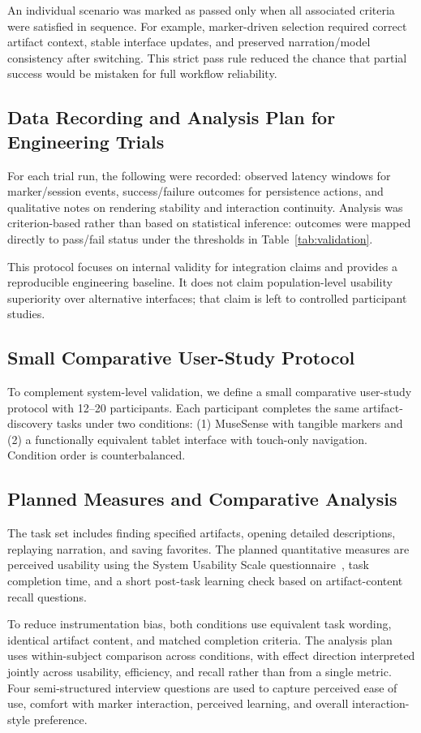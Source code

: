 \documentclass[conference]{IEEEtran}
\begin{document}
An individual scenario was marked as passed only when all associated criteria were satisfied in sequence. For example, marker-driven selection required correct artifact context, stable interface updates, and preserved narration/model consistency after switching. This strict pass rule reduced the chance that partial success would be mistaken for full workflow reliability.

\subsection{Data Recording and Analysis Plan for Engineering Trials}
For each trial run, the following were recorded: observed latency windows for marker/session events, success/failure outcomes for persistence actions, and qualitative notes on rendering stability and interaction continuity. Analysis was criterion-based rather than based on statistical inference: outcomes were mapped directly to pass/fail status under the thresholds in Table~\ref{tab:validation}.

This protocol focuses on internal validity for integration claims and provides a reproducible engineering baseline. It does not claim population-level usability superiority over alternative interfaces; that claim is left to controlled participant studies.

\subsection{Small Comparative User-Study Protocol}
To complement system-level validation, we define a small comparative user-study protocol with 12--20 participants. Each participant completes the same artifact-discovery tasks under two conditions: (1) MuseSense with tangible markers and (2) a functionally equivalent tablet interface with touch-only navigation. Condition order is counterbalanced.

\subsection{Planned Measures and Comparative Analysis}
The task set includes finding specified artifacts, opening detailed descriptions, replaying narration, and saving favorites. The planned quantitative measures are perceived usability using the System Usability Scale questionnaire~\cite{brooke1996}, task completion time, and a short post-task learning check based on artifact-content recall questions.

To reduce instrumentation bias, both conditions use equivalent task wording, identical artifact content, and matched completion criteria. The analysis plan uses within-subject comparison across conditions, with effect direction interpreted jointly across usability, efficiency, and recall rather than from a single metric. Four semi-structured interview questions are used to capture perceived ease of use, comfort with marker interaction, perceived learning, and overall interaction-style preference.
\end{document}
